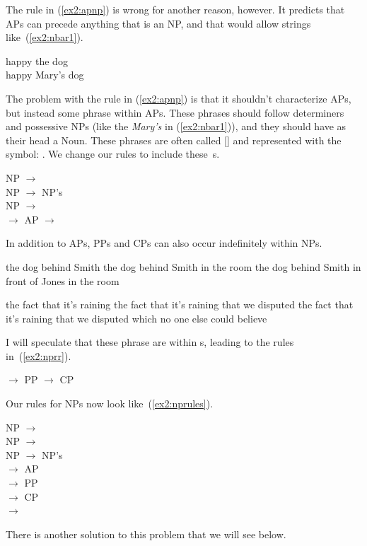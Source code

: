 The rule in (\ref{ex2:apnp}) is wrong for another reason, however. It predicts that APs can precede anything that is an NP, and that would allow strings like~(\ref{ex2:nbar1}).
\begin{exe}
	\raggedright
	\ex \label{ex2:nbar1} 
	happy the dog\\ happy Mary's dog
\end{exe}
The problem with the rule in (\ref{ex2:apnp}) is that it shouldn't characterize APs, but instead some phrase within APs. These phrases should follow determiners and possessive NPs (like the \emph{Mary's} in (\ref{ex2:nbar1})), and they should have as their head a Noun. These phrases are often called [] and represented with the symbol: . We change our rules to include these~s.
\begin{exe}
	\raggedright
	\ex \label{ex2:nbar2} 
	 NP $\rightarrow$  \\
	 NP $\rightarrow$ NP's \\
	 NP $\rightarrow$ \\
	  $\rightarrow$ AP 
	  $\rightarrow$ 
\end{exe}
In addition to APs, PPs and CPs can also occur indefinitely within NPs.
\begin{exe}
	\raggedright
	\ex \label{ex2:ppnpr} 
	\begin{xlist}
		\ex the dog behind Smith
		\ex the dog behind Smith in the room
		\ex the dog behind Smith in front of Jones in the room
	\end{xlist}
	\ex \label{ex2:cpnpr}
	\begin{xlist}
		\ex the fact that it's raining
		\ex the fact that it's raining that we disputed
		\ex the fact that it's raining that we disputed which no one else could believe
	\end{xlist}
\end{exe}
I will speculate that these phrase are within s, leading to the rules in~(\ref{ex2:nprr}).
\begin{exe}
	\raggedright
	\ex \label{ex2:nprr} 
	\begin{xlist}
		\ex {} $\rightarrow$ \ibar{N} PP
		\ex {} $\rightarrow$ \ibar{N} CP
	\end{xlist}
\end{exe}
Our rules for NPs now look like~(\ref{ex2:nprules}).
\begin{exe}
	\raggedright
	\ex \label{ex2:nprules} 
	NP $\rightarrow$ \\
	NP $\rightarrow$  \\
	NP $\rightarrow$ NP's \\
	 $\rightarrow$ AP \\
	 $\rightarrow$  PP\\
	 $\rightarrow$  CP\\
	 $\rightarrow$ 
\end{exe}
There is another solution to this problem that we will see below.


